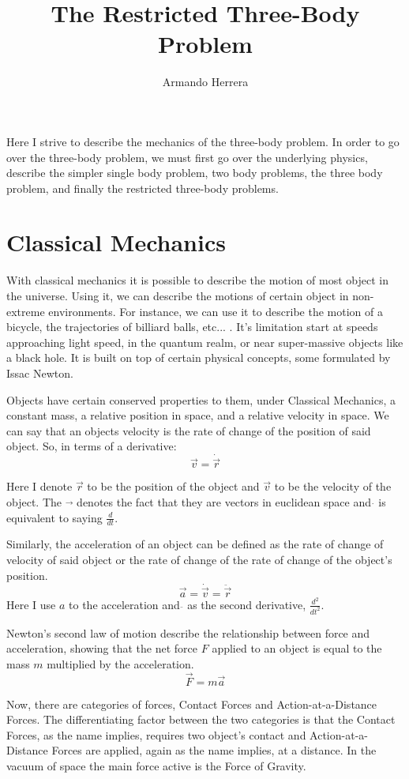 \documentclass{article}
\title{The Restricted Three-Body Problem}
\author{Armando Herrera}
\begin{document}
\maketitle

Here I strive to describe the mechanics of the three-body problem. In order to go over the three-body problem, we must first go over the underlying physics, describe the simpler single body problem, two body problems, the three body problem, and finally the restricted three-body problems.

\section{Classical Mechanics}

With classical mechanics it is possible to describe the motion of most object in the universe. Using it, we can describe the motions of certain object in non-extreme environments. For instance, we can use it to describe the motion of a bicycle, the trajectories of billiard balls, etc... . It's limitation start at speeds approaching light speed, in the quantum realm, or near super-massive objects like a black hole. It is built on top of certain physical concepts, some formulated by Issac Newton.

Objects have certain conserved properties to them, under Classical Mechanics, a constant mass, a relative position in space, and a relative velocity in space. We can say that an objects velocity is the rate of change of the position of said object. So, in terms of a derivative: $$\vec{v}=\dot{\vec{r}}$$ 

Here I denote $\vec{r}$ to be the position of the object and $\vec{v}$ to be the velocity of the object. The $\vec{}$ denotes the fact that they are vectors in euclidean space and $\dot{}$ is equivalent to saying $\frac{d}{dt}$.

Similarly, the acceleration of an object can be defined as the rate of change of velocity of said object or the rate of change of the rate of change of the object's position. $$\vec{a}=\dot{\vec{v}}=\ddot{\vec{r}}$$ 
Here I use $a$ to the acceleration and $\ddot{}$ as the second derivative, $\frac{d^2}{dt^2}$.

Newton's second law of motion describe the relationship between force and acceleration, showing that the net force $F$ applied to an object is equal to the mass $m$ multiplied by the acceleration. $$\vec{F}=m\vec{a}$$

Now, there are categories of forces, Contact Forces and Action-at-a-Distance Forces. The differentiating factor between the two categories is that the Contact Forces, as the name implies, requires two object's contact and Action-at-a-Distance Forces are applied, again as the name implies, at a distance. In the vacuum of space the main force active is the Force of Gravity.
\end{document}
